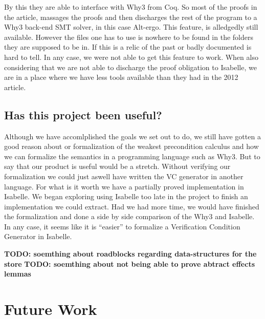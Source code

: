 By this they are able to interface with Why3 from Coq.
So most of the proofs in the article, massages the proofs and then discharges the rest of the program to a Why3 back-end SMT solver, in this case Alt-ergo.
This feature, is alledgedly still available\cite{TODO:LIERS}. However the files one has to use is nowhere to be found in the folders they are supposed to be in.
If this is a relic of the past or badly documented is hard to tell. In any case, we were not able to get this feature to work.
When also considering that we are not able to discharge the proof obligation to Isabelle, we are in a place where we have less tools available than they had in the 2012 article.

\subsection{Has this project been useful?}
Although we have accomlplished the goals we set out to do, we still have gotten a good reason about or formalization of the weakest precondition calculus and how we can formalize the semantics in a programming language such as Why3.
But to say that our product is useful would be a stretch. Without verifying our formalization we could just aswell have written the VC generator in another language.
For what is it worth we have a partially proved implementation in Isabelle.
We began exploring using Isabelle too late in the project to finish an implementation we could extract.
Had we had more time, we would have finished the formalization and done a side by side comparison of the Why3 and Isabelle.
In any case, it seems like it is ``easier'' to formalize a Verification Condition Generator in Isabelle.

\textbf{TODO: soemthing about roadblocks regarding data-structures for the store}
\textbf{TODO: soemthing about not being able to prove abtract effects lemmas}

\section{Future Work}\label{sec:future}
